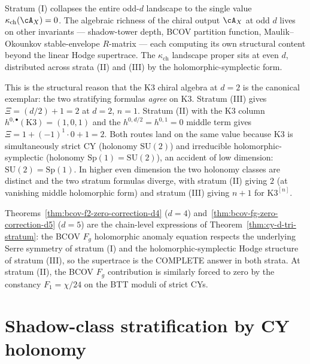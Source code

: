 \begin{remark}
\label{rem:kappa-ch-landscape-even-d}
Stratum (I) collapses the entire odd-$d$ landscape to the single value
$\kappa_{\mathrm{ch}}(\cA_X) = 0$. The algebraic richness of the chiral
output $\cA_X$ at odd $d$ lives on other invariants — shadow-tower
depth, BCOV partition function, Maulik--Okounkov stable-envelope
$R$-matrix — each computing its own structural content beyond the
linear Hodge supertrace. The $\kappa_{\mathrm{ch}}$ landscape proper
sits at even $d$, distributed across strata (II) and (III) by the
holomorphic-symplectic form.

This is the structural reason that the K$3$ chiral algebra at $d = 2$ is
the canonical exemplar: the two stratifying formulas \emph{agree} on K$3$.
Stratum (III) gives $\Xi = (d/2) + 1 = 2$ at $d = 2$, $n = 1$. Stratum (II)
with the K$3$ column $h^{0, \bullet}(\mathrm{K}3) = (1, 0, 1)$ and the
$h^{0, d/2} = h^{0, 1} = 0$ middle term gives
$\Xi = 1 + (-1)^{1} \cdot 0 + 1 = 2$. Both routes land on the same value
because K$3$ is simultaneously strict CY (holonomy $\mathrm{SU}(2)$) and
irreducible holomorphic-symplectic (holonomy $\mathrm{Sp}(1) = \mathrm{SU}(2)$),
an accident of low dimension: $\mathrm{SU}(2) = \mathrm{Sp}(1)$. In higher
even dimension the two holonomy classes are distinct and the two
stratum formulas diverge, with stratum (II) giving $2$ (at vanishing
middle holomorphic form) and stratum (III) giving $n + 1$ for K$3^{[n]}$.
\end{remark}

\begin{corollary}
\label{cor:bcov-fg-vanishing-all-even-d}
Theorems~\ref{thm:bcov-f2-zero-correction-d4} \textup{(}$d = 4$\textup{)}
and~\ref{thm:bcov-fg-zero-correction-d5} \textup{(}$d = 5$\textup{)} are
the chain-level expressions of Theorem~\ref{thm:cy-d-tri-stratum}: the
BCOV $F_g$ holomorphic anomaly equation respects the underlying Serre
symmetry of stratum (I) and the holomorphic-symplectic Hodge structure of
stratum (III), so the supertrace is the COMPLETE answer in both strata.
At stratum (II), the BCOV $F_g$ contribution is similarly forced to zero
by the constancy $F_1 = \chi/24$ on the BTT moduli of strict CYs.
\end{corollary}

\section{Shadow-class stratification by CY holonomy}
\label{sec:cy-d-shadow-class-stratification}

